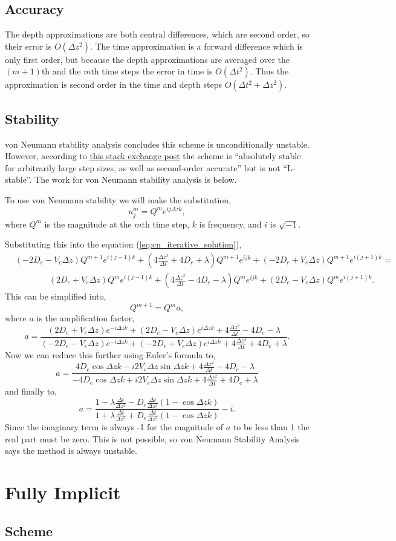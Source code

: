 \documentclass[11pt, letterpaper]{article}
\begin{document}
\subsection*{Accuracy}

The depth approximations are both central differences, which are second order, so their error is $O(\Delta z^2)$.
The time approximation is a forward difference which is only first order, but because the depth approximations are averaged over the $(m + 1)$th and the $m$th time steps the error in time is $O(\Delta t^2)$.
Thus the approximation is second order in the time and depth steps $O(\Delta t^2 + \Delta z^2)$.


\subsection*{Stability}

von Neumann stability analysis concludes this scheme is unconditionally unstable.
However, according to \href{www.example.com}{\underline{this stack exchange post}} the scheme is ``absolutely stable for arbitrarily large step sizes, as well as second-order accurate'' but is not ``L-stable''.
The work for von Neumann stability analysis is below.

To use von Neumann stability we will make the substitution,
\[
    u^m_j = Q^me^{ij\Delta z k},
\]
where $Q^m$ is the magnitude at the $m$th time step, $k$ is frequency, and $i$ is $\sqrt{-1}$.

Substituting this into the equation (\ref{eq:cn_iterative_solution}),
\[
    \begin{split}
        &(-2D_e - V_e\Delta z)Q^{m + 1}e^{i(j - 1)k} + \left(4\frac{\Delta z^2}{\Delta t} + 4D_e + \lambda\right)Q^{m + 1}e^{ijk} + (-2D_e + V_e \Delta z) Q^{m + 1}e^{i(j + 1)k} = \\
        &\qquad\qquad (2D_e + V_e\Delta z)Q^me^{i(j - 1)k} + \left(4\frac{\Delta z^2}{\Delta t} - 4D_e - \lambda\right)Q^me^{ijk} + (2D_e - V_e \Delta z) Q^me^{i(j + 1)k}.
    \end{split}
\]
This can be simplified into,
\[
    Q^{m + 1} = Q^m a,
\]
where $a$ is the amplification factor,
\[
    a = \frac{(2D_e + V_e\Delta z)e^{-i\Delta zk} + (2D_e - V_e\Delta z)e^{i\Delta zk} + 4\frac{\Delta z^2}{\Delta t} - 4D_e - \lambda}
    {(-2D_e - V_e\Delta z)e^{-i\Delta zk} + (-2D_e + V_e\Delta z)e^{i\Delta zk} + 4\frac{\Delta z^2}{\Delta t} + 4D_e + \lambda}.
\]
Now we can reduce this further using Euler's formula to,
\[
    a = \frac{4D_e\cos\Delta zk - i2V_e\Delta z\sin \Delta z k + 4\frac{\Delta z^2}{\Delta t} - 4D_e - \lambda}
    {-4D_e\cos\Delta zk + i2V_e\Delta z\sin \Delta z k + 4\frac{\Delta z^2}{\Delta t} + 4D_e + \lambda}
\]
and finally to,
\[
    a = \frac{1 - \lambda\frac{\Delta t}{\Delta z^2} - D_e\frac{\Delta t}{\Delta z^2} (1 - \cos\Delta z k)}
    {1 + \lambda\frac{\Delta t}{\Delta z^2} + D_e\frac{\Delta t}{\Delta z^2} (1 - \cos\Delta z k)} - i.
\]
Since the imaginary term is always -1 for the magnitude of $a$ to be less than 1 the real part must be zero.
This is not possible, so von Neumann Stability Analysis says the method is always unstable.

\section*{Fully Implicit}

\subsection*{Scheme}
\end{document}
